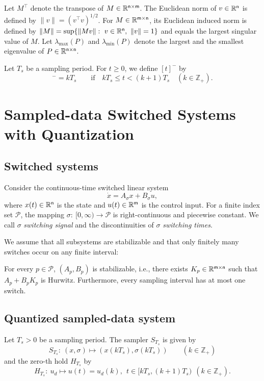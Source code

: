 \documentclass[a4, 11pt]{article}
\begin{document}
Let $M^{\top}$ denote the transpose of $M \in \mathbb{R}^{\sf n\times m}$.
The Euclidean norm of $v \in \mathbb{R}^{\sf n}$ is defined by
$\|v\| = (v^{\top}v)^{1/2}$.
For $M \in \mathbb{R}^{\sf m\times n}$, its Euclidean induced norm is
defined by $\|M\| = \sup \{ \|Mv\|:~v\in \mathbb{R}^{\sf n},~\|v\|= 1 \}$ and
equals the largest singular value of $M$.
Let $\lambda_{\max}(P)$ and $\lambda_{\min}(P)$ denote
the largest and the smallest eigenvalue of $P \in \mathbb{R}^{\sf n\times n}$.

Let $T_s$ be a sampling period. For $t \geq 0$,
we define $[t]^-$ by
\begin{equation*}
[t]^- = kT_s\qquad \text{if~~~}kT_s \leq t < (k+1)T_s \quad (k \in \mathbb{Z}_+).
\end{equation*}

\section{Sampled-data Switched Systems with Quantization}
\subsection{Switched systems}
Consider the continuous-time switched linear system
\begin{equation}
\label{eq:SLS}
\dot x = A_{\sigma}x + B_{\sigma}u, 
\end{equation}
where $x(t) \in \mathbb{R}^{\sf n}$ is the state and 
$u(t) \in \mathbb{R}^{\sf m}$ is the control input.
For a finite index set $\mathcal{P}$, the mapping 
$\sigma:~[0,\infty) \to \mathcal{P}$ is right-continuous and piecewise constant.
We call $\sigma$ \textit{switching signal} and the discontinuities of $\sigma$ 
\textit{switching times}.

We assume that all subsystems are stabilizable and that
only finitely many switches occur on any finite interval:
\begin{assumption}
\label{ass:system}
For every $p \in \mathcal{P}$, $(A_p, B_p)$ is stabilizable, i.e., 
there exists $K_p \in \mathbb{R}^{\sf m \times n}$ such that
$A_p+B_pK_p$ is Hurwitz. 
Furthermore, every sampling interval has 
at most one switch.
\end{assumption}

\subsection{Quantized sampled-data system}
Let $T_s > 0$ be a sampling period.
The sampler $S_{T_s}$ is given by
\begin{equation*}
S_{T_s}:~ (x,\sigma) \mapsto (x(kT_s),\sigma(kT_s))\qquad (k \in \mathbb{Z}_+)
\end{equation*}
and
the zero-th hold $H_{T_s}$ by
\begin{equation*}
H_{T_s}:~u_d \mapsto u(t)=u_d(k),~~ t\in[kT_s,(k+1)T_s)~~ (k \in \mathbb{Z}_+).
\end{equation*}
\end{document}
